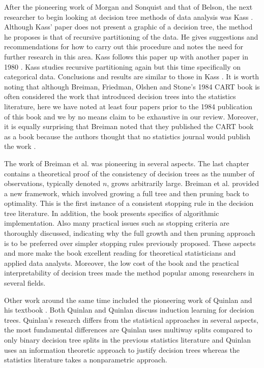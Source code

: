 After the pioneering work of Morgan and Sonquist and that of Belson, the next researcher to begin looking at decision tree methods of data analysis was Kass \cite{kass1975significance}. Although Kass' paper does not present a graphic of a decision tree, the method he proposes is that of recursive partitioning of the data. He gives suggestions and recommendations for how to carry out this procedure and notes the need for further research in this area. Kass follows this paper up with another paper in 1980 \cite{kass1980exploratory}. Kass \cite{kass1980exploratory} studies recursive partitioning again but this time specifically on categorical data. Conclusions and results are similar to those in Kass \cite{kass1975significance}. It is worth noting that although Breiman, Friedman, Olshen and Stone's 1984 CART book \cite{breiman1984classification} is often considered the work that introduced decision trees into the statistics literature, here we have noted at least four papers prior to the 1984 publication of this book and we by no means claim to be exhaustive in our review.  Moreover, it is equally surprising that Breiman noted that they published the CART book as a book because the authors thought that no statistics journal would publish the work \cite{friedman2011remembering}.  

The work of Breiman et al. \cite{breiman1984classification} was pioneering in several aspects. The last chapter contains a theoretical proof of the consistency of decision trees as the number of observations, typically denoted $n$, grows arbitrarily large. Breiman et al. provided a new framework, which involved growing a full tree and then pruning back to optimality. This is the first instance of a consistent stopping rule in the decision tree literature. In addition, the book presents specifics of algorithmic implementation. Also many practical issues such as stopping criteria are thoroughly discussed, indicating why the full growth and then pruning approach is to be preferred over simpler stopping rules previously proposed. These aspects and more make the book excellent reading for theoretical statisticians and applied data analysts. Moreover, the low cost of the book and the practical interpretability of decision trees made the method popular among researchers in several fields.

Other work around the same time included the pioneering work of Quinlan \cite{quinlan1986induction} and his textbook \cite{quinlan1993c4}. Both Quinlan \cite{quinlan1986induction} and Quinlan \cite{quinlan1993c4} discuss induction learning for decision trees. Quinlan's research differs from the statistical approaches in several aspects, the most fundamental differences are Quinlan uses multiway splits compared to only binary decision tree splits in the previous statistics literature and Quinlan uses an information theoretic approach to justify decision trees whereas the statistics literature takes a nonparametric approach.  

